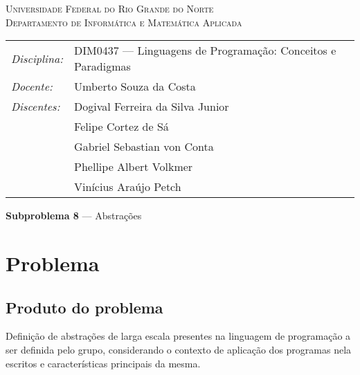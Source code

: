 \documentclass[12pt, a4paper]{article}
\begin{document}
\begin{center}
    \textsc{Universidade Federal do Rio Grande do Norte} \\
    \textsc{Departamento de Informática e Matemática Aplicada}
\end{center}

\bigskip

\begin{tabular}{@{}ll@{}}
    \emph{Disciplina:} & DIM0437 --- Linguagens de Programação:
                            Conceitos e Paradigmas \\
    \emph{Docente:}    & Umberto Souza da Costa \\
    \emph{Discentes:}  & Dogival Ferreira da Silva Junior \\
                       & Felipe Cortez de Sá \\
                       & Gabriel Sebastian von Conta \\
                       & Phellipe Albert Volkmer \\
                       & Vinícius Araújo Petch
\end{tabular}

\bigskip

\begin{center}
\large \textbf{Subproblema 8} --- Abstrações
\end{center}

\section{Problema}
    \subsection{Produto do problema}
    Definição  de abstrações de larga escala presentes na linguagem de
    programação a ser definida pelo grupo, considerando o contexto de aplicação
    dos programas nela escritos e características principais da mesma.
\end{document}
